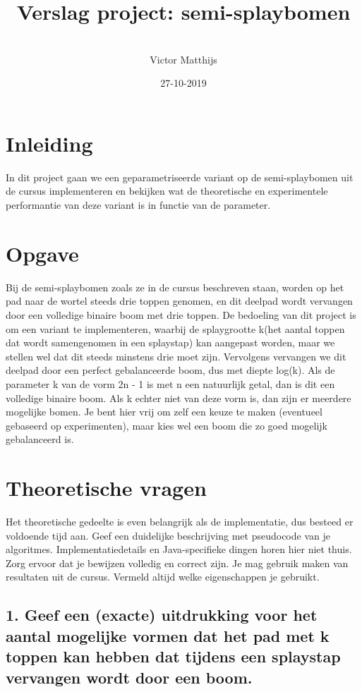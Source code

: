 \documentclass[dutch, 11pt]{report}
\title{Verslag project: semi-splaybomen}
\author{\Course\\
Victor Matthijs}
\date{27-10-2019}
\begin{document}
\maketitle

\section*{Inleiding}
In dit project gaan we een geparametriseerde variant op de semi-splaybomen uit de cursus implementeren en bekijken wat de theoretische en experimentele performantie van deze variant is in functie van de parameter.


\section*{Opgave}
Bij de semi-splaybomen zoals ze in de cursus beschreven staan, worden op het pad naar de wortel steeds drie toppen genomen, en dit deelpad wordt vervangen door een volledige binaire boom met drie toppen. De bedoeling van dit project is om een variant te implementeren, waarbij de splaygrootte k(het aantal toppen dat wordt samengenomen in een splaystap) kan aangepast worden, maar we stellen wel dat dit steeds minstens drie moet zijn. Vervolgens vervangen we dit deelpad door een perfect gebalanceerde boom, dus met diepte log(k). Als de parameter k van de vorm 2n - 1 is met n een natuurlijk getal, dan is dit een volledige binaire boom. Als k echter niet van deze vorm is, dan zijn er meerdere mogelijke bomen. Je bent hier vrij om zelf een keuze te maken (eventueel gebaseerd op experimenten), maar kies wel een boom die zo goed mogelijk gebalanceerd is.

\section*{Theoretische vragen}
Het theoretische gedeelte is even belangrijk als de implementatie, dus besteed er voldoende tijd aan. Geef een duidelijke beschrijving met pseudocode van je algoritmes. Implementatiedetails en Java-specifieke dingen horen hier niet thuis. Zorg ervoor dat je bewijzen volledig en correct zijn. Je mag gebruik maken van resultaten uit de cursus. Vermeld altijd welke eigenschappen je gebruikt.\newpage

\subsection*{1. Geef een (exacte) uitdrukking voor het aantal mogelijke vormen dat het pad met k toppen kan hebben dat tijdens een splaystap vervangen wordt door een boom.}
\end{document}
